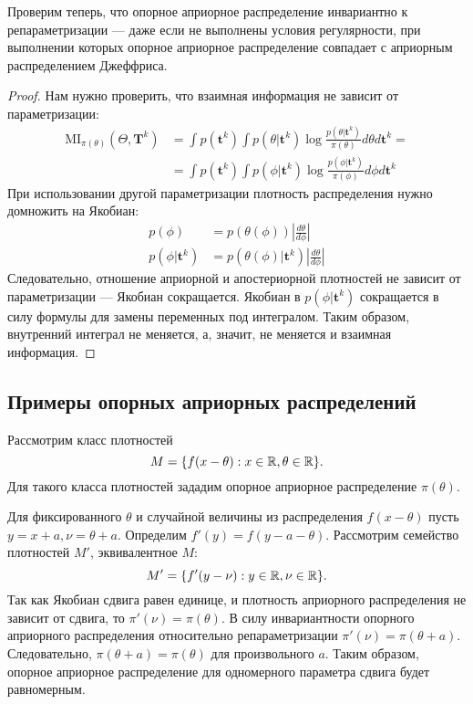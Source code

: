 Проверим теперь, что опорное априорное распределение 
инвариантно к репараметризации --- даже если не выполнены условия регулярности, при выполнении которых опорное априорное распределение совпадает с априорным распределением Джеффриса.
\begin{proof}
Нам нужно проверить, что взаимная информация не зависит от параметризации:
\begin{align*}
\mathrm{MI}_{\pi(\theta)}(\Theta, \mathbf{T}^k) &= \int p(\mathbf{t}^k) \int p(\theta | \mathbf{t}^k) \log \frac{p(\theta | \mathbf{t}^k)}{\pi(\theta)} d\theta d\mathbf{t}^k = \\ &= \int p(\mathbf{t}^k) \int p(\phi | \mathbf{t}^k) \log \frac{p(\phi | \mathbf{t}^k)}{\pi(\phi)} d\phi d\mathbf{t}^k
\end{align*}
При использовании другой параметризации плотность распределения нужно домножить на Якобиан:
\begin{align*}
p(\phi) &= p(\theta(\phi)) \left|\frac{d \theta}{d \phi} \right| \\
p(\phi | \mathbf{t}^k) &= p(\theta(\phi) | \mathbf{t}^k) \left|\frac{d \theta}{d \phi} \right|
\end{align*}
Следовательно, отношение априорной и апостериорной плотностей не зависит от параметризации --- Якобиан сокращается.
Якобиан в $p(\phi | \mathbf{t}^k)$ сокращается в силу формулы для замены переменных под интегралом.
Таким образом, внутренний интеграл не меняется, а, значит, не меняется и взаимная информация.
\end{proof}

\subsection{Примеры опорных априорных распределений}

\begin{example}
Рассмотрим класс плотностей 
\[
M = \{f(x - \theta) : x \in \mathbb{R}, \theta \in \mathbb{R} \}.
\]
Для такого класса плотностей зададим опорное априорное распределение $\pi(\theta)$.

Для фиксированного $\theta$ и случайной величины из распределения $f(x - \theta)$ пусть $y = x + a, \nu = \theta + a$.
Определим $f'(y) = f(y - a - \theta)$.
Рассмотрим семейство плотностей $M'$, эквивалентное $M$:
\[
M' =\{f'(y - \nu): y \in \mathbb{R}, \nu \in \mathbb{R} \}.
\]
Так как Якобиан сдвига равен единице, и плотность априорного распределения 
не зависит от сдвига, то $\pi'(\nu) = \pi(\theta)$.
В силу инвариантности опорного априорного распределения относительно 
репараметризации $\pi'(\nu) = \pi(\theta + a)$.
Следовательно, $\pi(\theta + a) = \pi(\theta)$ для произвольного $a$.
Таким образом, опорное априорное распределение для одномерного параметра сдвига будет равномерным.
\end{example}

